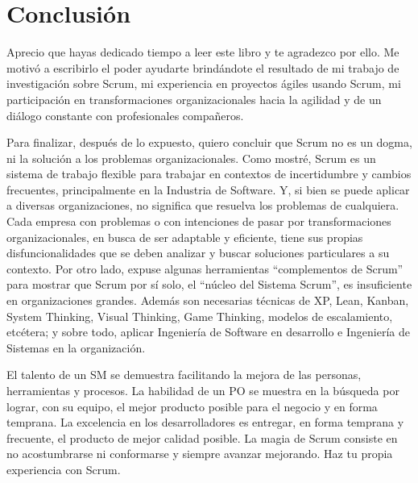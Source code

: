 \chapter{Conclusión}

Aprecio que hayas dedicado tiempo a leer este libro y te agradezco por ello. Me motivó a escribirlo el poder ayudarte brindándote el resultado de mi trabajo de investigación sobre Scrum, mi experiencia en proyectos ágiles usando Scrum, mi participación en transformaciones organizacionales hacia la agilidad y de un diálogo constante con profesionales compañeros. 

Para finalizar, después de lo expuesto, quiero concluir que Scrum no es un dogma, ni la solución a los problemas organizacionales. Como mostré, Scrum es un sistema de trabajo flexible para trabajar en contextos de incertidumbre y cambios frecuentes, principalmente en la Industria de Software. Y, si bien se puede aplicar a diversas organizaciones, no significa que resuelva los problemas de cualquiera. Cada empresa con problemas o con intenciones de pasar por transformaciones organizacionales, en busca de ser adaptable y eficiente, tiene sus propias disfuncionalidades que se deben analizar y buscar soluciones particulares a su contexto. Por otro lado, expuse algunas herramientas “complementos de Scrum” para mostrar que Scrum por sí solo, el “núcleo del Sistema Scrum”, es insuficiente en organizaciones grandes. Además son necesarias técnicas de XP, Lean, Kanban, System Thinking, Visual Thinking, Game Thinking, modelos de escalamiento, etcétera; y sobre todo, aplicar Ingeniería de Software en desarrollo e Ingeniería de Sistemas en la organización.

El talento de un SM se demuestra facilitando la mejora de las personas, herramientas y procesos. La habilidad de un PO se muestra en la búsqueda por lograr, con su equipo, el mejor producto posible para el negocio y en forma temprana. La excelencia en los desarrolladores es entregar, en forma temprana y frecuente, el producto de mejor calidad posible. La magia de Scrum consiste en no acostumbrarse ni conformarse y siempre avanzar mejorando. Haz tu propia experiencia con Scrum.
